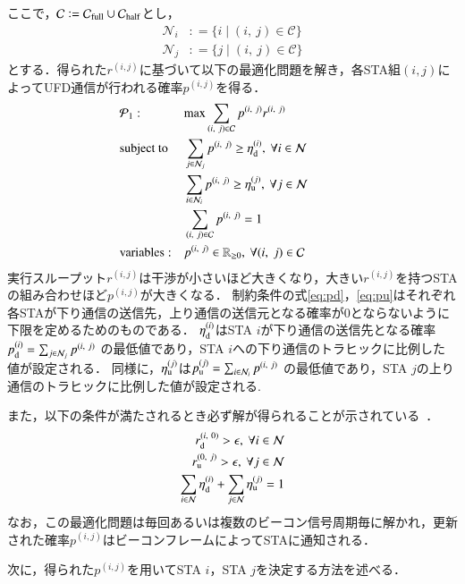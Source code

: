 \documentclass[technicalreport]{ieicej}
\newcommand{\sij}{(i,j)}
\newcommand{\mN}{{\mathcal N}}
\newcommand{\pij}{p^{(i,j)}}
\newcommand{\rij}{r^{\sij}}
\def\equiv{\mathrel{\mathop:}=}
\begin{document}
		ここで，${\mathcal C} \equiv {\mathcal C}_{\rm full} \cup {\mathcal C}_{\rm half}$とし，
		\begin{align}
			{\mathcal N}_i &\equiv \{i\mid(i,\ j)\in{\mathcal C}\}\\
			{\mathcal N}_j &\equiv \{j\mid(i,\ j)\in{\mathcal C}\}
		\end{align}
		とする．得られた$\rij$に基づいて以下の最適化問題を解き，各STA組$\sij$によってUFD通信が行われる確率$\pij$を得る．
		\begin{align}
			&{\mathcal P}_1: && {\rm max} \sum_{(i,\ j)\in{\mathcal C}} p^{(i,\ j)}r^{(i,\ j)} &&&&&& \label{eq:p1}\\
			&{\rm subject\ to} && \sum_{j\in{\mathcal N}_j} p^{(i,\ j)} \geq \eta_{\rm d}^{(i)},\ \forall i\in {\mathcal N} \label{eq:pd} \\
			&&& \sum_{i\in{\mathcal N}_i} p^{(i,\ j)} \geq \eta_{\rm u}^{(j)},\ \forall j\in {\mathcal N} \label{eq:pu}\\
			&&& \sum_{(i,\ j)\in{\mathcal C}} p^{(i,\ j)}=1 \\
			&{\rm variables:} &&p^{(i,\ j)} \in {\mathbb R}_{\geq 0},\ \forall(i,\ j)\in {\mathcal C} \nonumber
		\end{align}
		実行スループット$\rij$は干渉が小さいほど大きくなり，大きい$\rij$を持つSTAの組み合わせほど$p^{\sij}$が大きくなる．
		制約条件の式\eqref{eq:pd}，\eqref{eq:pu}はそれぞれ各STAが下り通信の送信先，上り通信の送信元となる確率が0とならないように下限を定めるためのものである．
		$\eta_{\rm d}^{(i)}$はSTA $i$が下り通信の送信先となる確率$p_{\rm d}^{(i)}=\sum_{j\in{\mathcal N}_j} p^{(i,\ j)}$
		の最低値であり，STA $i$への下り通信のトラヒックに比例した値が設定される．
		同様に，$\eta_{\rm u}^{(j)}$は$p_{\rm u}^{(j)}=\sum_{i\in{\mathcal N}_i} p^{(i,\ j)}$
		の最低値であり，STA $j$の上り通信のトラヒックに比例した値が設定される.
		\par
		また，以下の条件が満たされるとき必ず解が得られることが示されている~\cite{promac}．
		\begin{align}
			r_{\rm d}^{(i,\ 0)} >\epsilon,\ \forall i\in\mN \\
			r_{\rm u}^{(0,\ j)} >\epsilon,\ \forall j\in\mN \\
			\sum_{i\in\mN}\eta_{\rm d}^{(i)} + \sum_{j\in\mN}\eta_{\rm u}^{(j)} =1 \label{eq:feasible}
		\end{align}
		なお，この最適化問題は毎回あるいは複数のビーコン信号周期毎に解かれ，更新された確率$\pij$はビーコンフレームによってSTAに通知される．
		\par
		次に，得られた$\pij$を用いてSTA $i$，STA $j$を決定する方法を述べる．
\end{document}
